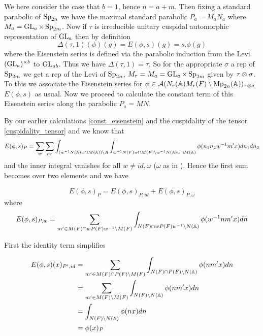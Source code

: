 We here consider the case that \(b=1\), hence \(n = a + m\). Then fixing a standard parabolic of \(\operatorname{Sp}_{2n}\) we have the maximal standard parabolic \(P_a = M_aN_a\) where \(M_a = \operatorname{GL}_a \times \operatorname{Sp}_{2m}\).  Now if \(\tau\) is irreducible unitary cuspidal automorphic representation of \(\operatorname{GL}_a\) then by definition 
\[\Delta(\tau, 1)(\phi)(g) = E(\phi,s)(g) = s.\phi(g)\]
where the Eisenstein series is defined via the parabolic induction from the Levi \((\operatorname{GL}_a)^{\times b} \) to \(\operatorname{GL}_{ab}\). Thus we have \(\Delta(\tau, 1) = \tau\). So for the appropriate \(\sigma \) a rep of \(\operatorname{Sp}_{2m}\) we get a rep of the Levi of \(\operatorname{Sp}_{2n}\), \(M_r = M_a = \operatorname{GL}_a\times \operatorname{Sp}_{2m}\) given by \(\tau\otimes \sigma\). To this we associate the Eisenstein series for \(\phi\in \mathcal{A}(N_r(\A)M_r(F)\setminus \Mp_{2n}(\A))_{\tau\tensor \sigma}\) \(E(\phi,s)\) as usual. Now we proceed to calculate the constant term of this Eisenstein series along the parabolic \(P_a = MN\). 

By our earlier calculations \ref{const_eisenstein} and the cuspidality of the tensor \ref{cuspidality_tensor} and \cite{jiangPolesCertainResidual2013} we know that 
     \[E(\phi, s)_{P} = \sum_{ w} \sum_{m'} \int_{(w\inv N(\A)w \cap M(\A)) \setminus A} \int_{w\inv N(F) w \cap M(F) \setminus w\inv N(\A)w \cap M(\A)} \phi( n_1 n_2 w\inv m' x)  dn_1 dn_2\] 
     and the inner integral vanishes for all \(w\neq id, \omega\) (\(\omega\) as in \cite{jiangPolesCertainResidual2013}). Hence the first sum becomes over two elements and we have 

     \[E(\phi, s)_{P} = E(\phi, s)_{P, id} + E(\phi, s)_{P, \omega}\]
     where 
     \[E(\phi, s)_{P, w} =  \sum_{m'\in M(F)\cap wP(F)w\inv\setminus M(F)} \int_{N(F)\cap wP(F)w\inv \setminus N(\A)} \phi( w\inv nm' x)  dn\]

First the identity term simplifies

     \begin{equation*}
        \begin{aligned}
            E(\phi, s)(x)_{P', id} &=  \sum_{m'\in M(F)\cap P(F)\setminus M(F)} \int_{N(F)\cap P(F) \setminus N(\A)} \phi( nm' x)  dn\\
            &= \sum_{m'\in M(F)\setminus M(F)} \int_{N(F)\setminus N(\A)} \phi( nm' x)  dn \\
            &=\int_{N(F)\setminus N(\A)} \phi( n x)  dn \\
            &= \phi(x)_P
        \end{aligned}
     \end{equation*}

